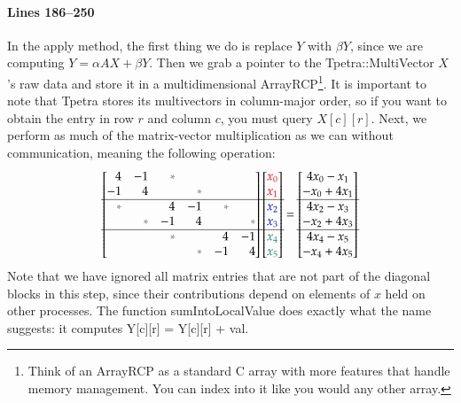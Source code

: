 \documentclass[pdf,12pt,report,strict]{SANDreport}
\begin{document}
\paragraph{Lines 186--250}
In the apply method, the first thing we do is replace $Y$ with $\beta Y$, since
we are computing $Y = \alpha AX + \beta Y$.
Then we grab a pointer to the Tpetra::MultiVector $X$'s raw data and store it in
a multidimensional ArrayRCP\footnote{Think of an ArrayRCP as a standard C array
with more features that handle memory management.  You can index into it like
you would any other array.}.  It is important to note that Tpetra stores its
multivectors in column-major order, so if you want to obtain the entry in row
$r$ and column $c$, you must query $X[c][r]$.  Next, we perform as much of the
matrix-vector multiplication as we can without communication, meaning the
following operation:
\begin{equation*}
\begin{bmatrix*}[r]
4 & -1 & \color{gray}*\\
-1 & 4 &  & \color{gray}*\\
\hline 
\color{gray}* &  & 4 & -1 & \color{gray}*\\
 & \color{gray}* & -1 & 4 &  & \color{gray}*\\
\hline 
 &  & \color{gray}* &  & 4 & -1\\
 &  &  & \color{gray}* & -1 & 4\\
\end{bmatrix*}
\begin{bmatrix*}
\color{red}x_0 \\
\color{red}x_1 \\
\hline
\color{blue} x_2 \\
\color{blue} x_3 \\
\hline
\color{PineGreen}x_4 \\
\color{PineGreen}x_5
\end{bmatrix*}
=
\begin{bmatrix*}
4x_0-x_1 \\
-x_0+4x_1 \\
\hline
4x_2-x_3 \\
-x_2+4x_3 \\
\hline
4x_4-x_5 \\
-x_4+4x_5
\end{bmatrix*}
\end{equation*}
Note that we have ignored all matrix entries that are not part of the diagonal
blocks in this step, since their contributions depend on elements of $x$ held on
other processes.  The function sumIntoLocalValue does exactly what the name
suggests: it computes Y[c][r] = Y[c][r] + val.
\end{document}
